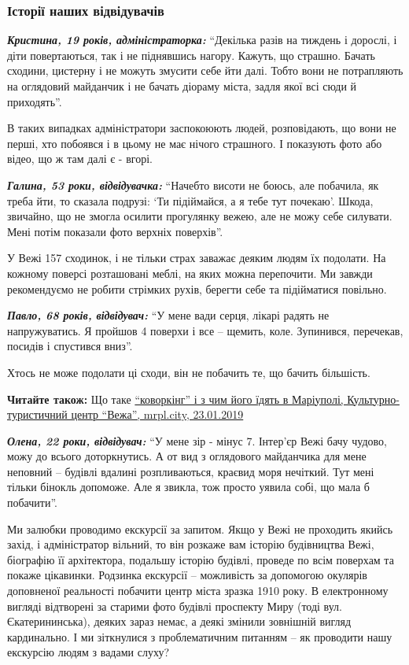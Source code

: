 \subsubsection{Історії наших відвідувачів}

\textbf{\emph{Кристина, 19 років, адміністраторка:}} \enquote{Декілька разів на тиждень і дорослі, і
діти повертаються, так і не піднявшись нагору. Кажуть, що страшно. Бачать
сходини, цистерну і не можуть змусити себе йти далі. Тобто вони не потрапляють
на оглядовий майданчик і не бачать діораму міста, задля якої всі сюди й
приходять}.

В таких випадках адміністратори заспокоюють людей, розповідають, що вони не
перші, хто побоявся і в цьому не має нічого страшного. І показують фото або
відео, що ж там далі є - вгорі.

\textbf{\emph{Галина, 53 роки, відвідувачка:}} \enquote{Начебто висоти не боюсь, але побачила, як треба
йти, то сказала подрузі: \enquote{Ти підіймайся, а я тебе тут почекаю}. Шкода,
звичайно, що не змогла осилити прогулянку вежею, але не можу себе силувати.
Мені потім показали фото верхніх поверхів}.

У Вежі 157 сходинок, і не тільки страх заважає деяким людям їх подолати. На
кожному поверсі розташовані меблі, на яких можна перепочити. Ми завжди
рекомендуємо не робити стрімких рухів, берегти себе та підійматися повільно.

\textbf{\emph{Павло, 68 років, відвідувач:}} \enquote{У мене вади серця, лікарі радять не
напружуватись. Я пройшов 4 поверхи і все – щемить, коле. Зупинився, перечекав,
посидів і спустився вниз}.

Хтось не може подолати ці сходи, він не побачить те, що бачить більшість.

\textbf{Читайте також:} Що таке \href{https://mrpl.city/blogs/view/shho-take-kovorking-i-z-chim-jogo-idyat-v-mariupoli}{%
\enquote{коворкінг} і з чим його їдять в Маріуполі, Культурно-туристичний центр \enquote{Вежа}, mrpl.city, 23.01.2019}

\textbf{\emph{Олена, 22 роки, відвідувач:}} \enquote{У мене зір - мінус 7. Інтер'єр
Вежі бачу чудово, можу до всього доторкнутись. А от вид з оглядового майданчика
для мене неповний – будівлі вдалині розпливаються, краєвид моря нечіткий. Тут
мені тільки бінокль допоможе. Але я звикла, тож просто уявила собі, що мала б
побачити}.

Ми залюбки проводимо екскурсії за запитом. Якщо у Вежі не проходить якийсь
захід, і адміністратор вільний, то він розкаже вам історію будівництва Вежі,
біографію її архітектора, подальшу історію будівлі, проведе по всім поверхам та
покаже цікавинки. Родзинка екскурсії – можливість за допомогою окулярів
доповненої реальності побачити центр міста зразка 1910 року. В електронному
вигляді відтворені за старими фото будівлі проспекту Миру (тоді вул.
Єкатерининська), деяких зараз немає, а деякі змінили зовнішній вигляд
кардинально. І ми зіткнулися з проблематичним питанням – як проводити нашу
екскурсію людям з вадами слуху?

